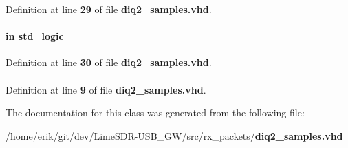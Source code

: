 Definition at line {\bf 29} of file {\bf diq2\+\_\+samples.\+vhd}.

\paragraph[{rxiqsel}]{ {\bfseries \textcolor{keywordflow}{in}\textcolor{vhdlchar}{ }} {\bfseries \textcolor{comment}{std\+\_\+logic}\textcolor{vhdlchar}{ }} \hspace{0.3cm}{\ttfamily [Port]}}\label{classdiq2__samples_a5f8c9b4907f6c220852b7ecbeba0f725}


Definition at line {\bf 30} of file {\bf diq2\+\_\+samples.\+vhd}.

\paragraph[{std\+\_\+logic\+\_\+1164}]{\hspace{0.3cm}{\ttfamily [Package]}}\label{classdiq2__samples_acd03516902501cd1c7296a98e22c6fcb}


Definition at line {\bf 9} of file {\bf diq2\+\_\+samples.\+vhd}.



The documentation for this class was generated from the following file\+:\begin{DoxyCompactItemize}
\item 
/home/erik/git/dev/\+Lime\+S\+D\+R-\/\+U\+S\+B\+\_\+\+G\+W/src/rx\+\_\+packets/{\bf diq2\+\_\+samples.\+vhd}\end{DoxyCompactItemize}
